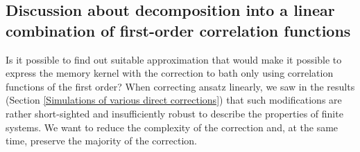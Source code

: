 \subsection{Discussion about decomposition into a linear combination of first-order correlation functions}
 \label{Discussion about decomposition into a linear combination of first-order correlation functions}
 
Is it possible to find out suitable approximation that would make it possible to express the memory kernel with the correction to bath only using correlation functions of the first order? When correcting ansatz linearly, we saw in the results (Section \ref{Simulations of various direct corrections}) that such modifications are rather short-sighted and insufficiently robust to describe the properties of finite systems. We want to reduce the complexity of the correction and, at the same time, preserve the majority of the correction.

